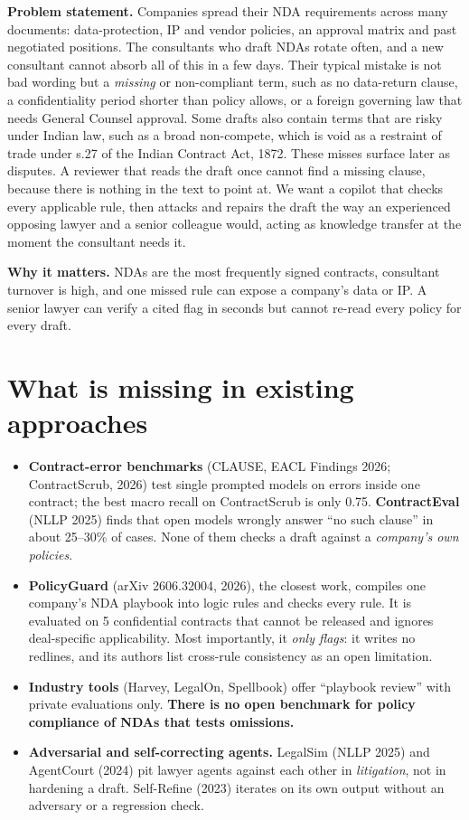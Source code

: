 \documentclass[11pt,a4paper]{article}
\begin{document}
\textbf{Problem statement.}
Companies spread their NDA requirements across many documents: data-protection, IP and vendor policies, an approval matrix and past negotiated positions.
The consultants who draft NDAs rotate often, and a new consultant cannot absorb all of this in a few days.
Their typical mistake is not bad wording but a \emph{missing} or non-compliant term, such as no data-return clause, a confidentiality period shorter than policy allows, or a foreign governing law that needs General Counsel approval.
Some drafts also contain terms that are risky under Indian law, such as a broad non-compete, which is void as a restraint of trade under s.27 of the Indian Contract Act, 1872.
These misses surface later as disputes.
A reviewer that reads the draft once cannot find a missing clause, because there is nothing in the text to point at.
We want a copilot that checks every applicable rule, then attacks and repairs the draft the way an experienced opposing lawyer and a senior colleague would, acting as knowledge transfer at the moment the consultant needs it.

\textbf{Why it matters.} NDAs are the most frequently signed contracts, consultant turnover is high, and one missed rule can expose a company's data or IP. A senior lawyer can verify a cited flag in seconds but cannot re-read every policy for every draft.

\section{What is missing in existing approaches}
\begin{itemize}
\item \textbf{Contract-error benchmarks} (CLAUSE, EACL Findings 2026; ContractScrub, 2026) test single prompted models on errors inside one contract; the best macro recall on ContractScrub is only 0.75. \textbf{ContractEval} (NLLP 2025) finds that open models wrongly answer ``no such clause'' in about 25--30\% of cases. None of them checks a draft against a \emph{company's own policies}.
\item \textbf{PolicyGuard} (arXiv 2606.32004, 2026), the closest work, compiles one company's NDA playbook into logic rules and checks every rule. It is evaluated on 5 confidential contracts that cannot be released and ignores deal-specific applicability. Most importantly, it \emph{only flags}: it writes no redlines, and its authors list cross-rule consistency as an open limitation.
\item \textbf{Industry tools} (Harvey, LegalOn, Spellbook) offer ``playbook review'' with private evaluations only. \textbf{There is no open benchmark for policy compliance of NDAs that tests omissions.}
\item \textbf{Adversarial and self-correcting agents.} LegalSim (NLLP 2025) and AgentCourt (2024) pit lawyer agents against each other in \emph{litigation}, not in hardening a draft. Self-Refine (2023) iterates on its own output without an adversary or a regression check.
\end{itemize}
\end{document}
